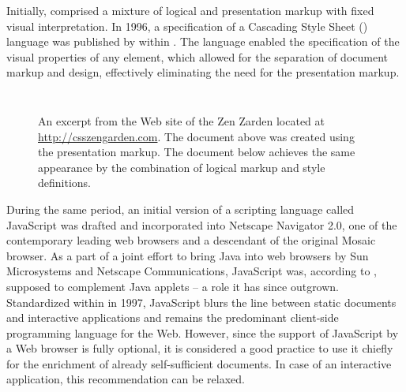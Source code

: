 \documentclass{book}
\begin{document}
        Initially,  comprised a mixture of logical and
        presentation markup with fixed visual interpretation. In 1996, a
        specification of a Cascading Style Sheet () language was
        published by  within \cite{lie96}. The language enabled
        the specification of the visual properties of any element, which allowed
        for the separation of document markup and design, effectively
        eliminating the need for the presentation markup.

        \begin{figure}
          \inputminted{html}{examples/02/presentation-markup.html}
          \caption{An excerpt from the Web site of the  Zen Zarden
            located at \protect\url{http://csszengarden.com}. The document above
            was created using the  presentation markup. The
            document below achieves the same appearance by the combination of
            logical markup and  style definitions.}\medskip
          \inputminted{html}{examples/02/logical-markup.html}
        \end{figure}

        During the same period, an initial version of a scripting language
        called JavaScript was drafted and incorporated into Netscape Navigator
        2.0, one of the contemporary leading web browsers and a descendant of
        the original Mosaic browser. As a part of a joint effort to bring Java
        into web browsers by Sun Microsystems and Netscape Communications,
        JavaScript was, according to \cite{js-announcement}, supposed to
        complement Java applets -- a role it has since outgrown. Standardized
        within \cite{ecma1} in 1997, JavaScript blurs the line between static
        documents and interactive applications and remains the predominant
        client-side programming language for the Web.  However, since the
        support of JavaScript by a Web browser is fully optional, it is
        considered a good practice to use it chiefly for the enrichment of
        already self-sufficient  documents. In case of an
        interactive application, this recommendation can be relaxed.
\end{document}

